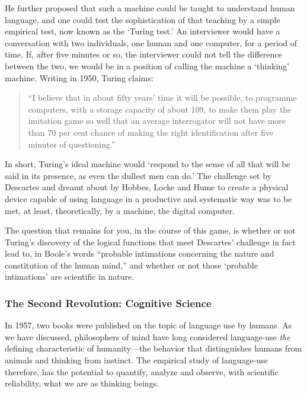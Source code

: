 He further proposed that such a machine could be taught to understand human language, and one could test the sophistication of that teaching by a simple empirical test, now known as the `Turing test.' An interviewer would have a conversation with two individuals, one human and one computer, for a period of time. If, after five minutes or so, the interviewer could not tell the difference between the two, we would be in a position of calling the machine a `thinking' machine. Writing in 1950, Turing claims:

\begin{quote}

``I believe that in about fifty years' time it will be possible, to programme computers, with a storage capacity of about 109, to make them play the imitation game so well that an average interrogator will not have more than 70 per cent chance of making the right identification after five minutes of questioning.''
\end{quote}

In short, Turing's ideal machine would `respond to the sense of all that will be said in its presence, as even the dullest men can do.' The challenge set by Descartes and dreamt about by Hobbes, Locke and Hume to create a physical device capable of using language in a productive and systematic way was to be met, at least, theoretically, by a machine, the digital computer.

The question that remains for you, in the course of this game, is whether or not Turing's discovery of the logical functions that meet Descartes' challenge in fact lead to, in Boole's words ``probable intimations concerning the nature and constitution of the human mind,'' and whether or not those `probable intimations' are scientific in nature.

\subsubsection{The Second Revolution: Cognitive Science}
\label{thesecondrevolution:cognitivescience}

In 1957, two books were published on the topic of language use by humans. As we have discussed, philosophers of mind have long considered language-use \emph{the} defining characteristic of humanity---the behavior that distinguishes humans from animals and thinking from instinct. The empirical study of language-use therefore, has the potential to quantify, analyze and observe, with scientific reliability, what we are as thinking beings.

